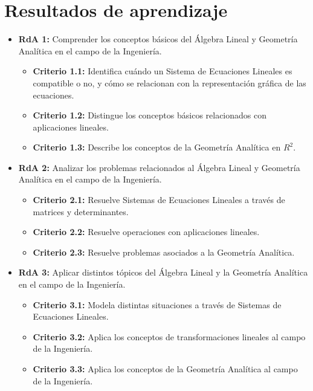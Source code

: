 \documentclass[a4,11pt]{aleph-notas}
\begin{document}
\addtolength{\headheight}{1.8\baselineskip}
\addtolength{\voffset}{-1.5\baselineskip}

\encabezado

\section{Resultados de aprendizaje} 

\begin{itemize}[leftmargin=*]
\item 
    \textbf{RdA 1:} Comprender los conceptos básicos del Álgebra Lineal y Geometría Analítica en el campo de la Ingeniería.
    \begin{itemize}[leftmargin=*]
        \item \textbf{Criterio 1.1:}  Identifica cuándo un Sistema de Ecuaciones Lineales es compatible o no, y cómo se relacionan con la representación gráfica de las ecuaciones.
        \item \textbf{Criterio 1.2:} Distingue los conceptos básicos relacionados con aplicaciones lineales.
        \item \textbf{Criterio 1.3:} Describe los conceptos de la Geometría Analítica en $R^2$.
    \end{itemize}
\item 
    \textbf{RdA 2:} Analizar los problemas relacionados al Álgebra Lineal y Geometría Analítica en el campo de la Ingeniería.
    \begin{itemize}[leftmargin=*]
        \item \textbf{Criterio 2.1:} Resuelve Sistemas de Ecuaciones Lineales a través de matrices y determinantes.
        \item \textbf{Criterio 2.2:} Resuelve operaciones con aplicaciones lineales.
        \item \textbf{Criterio 2.3:} Resuelve problemas asociados a la Geometría Analítica.
    \end{itemize}
\item
    \textbf{RdA 3:} Aplicar distintos tópicos del Álgebra Lineal y la Geometría Analítica en el campo de la Ingeniería.
    \begin{itemize}[leftmargin=*]
        \item \textbf{Criterio 3.1:} Modela distintas situaciones a través de Sistemas de Ecuaciones Lineales.
        \item \textbf{Criterio 3.2:} Aplica los conceptos de transformaciones lineales al campo de la Ingeniería.
        \item \textbf{Criterio 3.3:} Aplica los conceptos de la Geometría Analítica al campo de la Ingeniería.
    \end{itemize}
\end{itemize}
\end{document}
